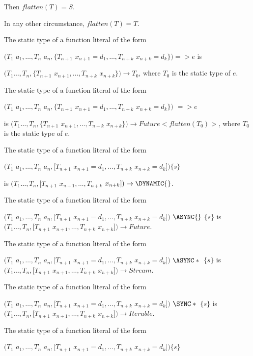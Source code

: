 \documentclass{article}
\begin{document}
Then $flatten(T) = S$.

In any other circumstance, $flatten(T) = T$.

\LMHash{}
The static type of a function literal of the form

$(T_1$ $a_1, \ldots, T_n$ $a_n, \{T_{n+1}$ $x_{n+1} = d_1, \ldots,  T_{n+k}$ $x_{n+k} = d_k\}) => e$
is

$(T_1 \ldots, T_n, \{T_{n+1}$ $x_{n+1}, \ldots, T_{n+k}$ $x_{n+k}\}) \rightarrow T_0$, where $T_0$ is the static type of $e$.

\LMHash{}
The static type of a function literal of the form

$(T_1$ $a_1, \ldots, T_n$ $a_n, \{T_{n+1}$ $x_{n+1} = d_1, \ldots,  T_{n+k}$ $x_{n+k} = d_k\})$ \ASYNC{}  $=> e$

is $(T_1 \ldots, T_n, \{T_{n+1}$ $x_{n+1}, \ldots, T_{n+k}$ $x_{n+k}\}) \rightarrow Future<flatten(T_0)>$, where $T_0$ is the static type of $e$.

\LMHash{}
The static type of a function literal of the form

$(T_1$ $a_1, \ldots, T_n$ $a_n, [T_{n+1}$ $x_{n+1} = d_1, \ldots,  T_{n+k}$ $x_{n+k}= d_k])\{s\}$

is $(T_1 \ldots, T_n, [T_{n+1}$ $x_{n+1}, \ldots, T_{n+k}$ $x_{n+k}]) \rightarrow  \DYNAMIC{}$.

\LMHash{}
The static type of a function literal of the form

$(T_1$ $a_1, \ldots, T_n$ $a_n, [T_{n+1}$ $x_{n+1} = d_1, \ldots,  T_{n+k}$ $x_{n+k}= d_k])$ $ \ASYNC{}$ $\{s\}$
is $(T_1 \ldots, T_n, [T_{n+1}$ $x_{n+1}, \ldots, T_{n+k}$ $x_{n+k}]) \rightarrow Future$.

\LMHash{}
The static type of a function literal of the form

$(T_1$ $a_1, \ldots, T_n$ $a_n, [T_{n+1}$ $x_{n+1} = d_1, \ldots,  T_{n+k}$ $x_{n+k}= d_k])$ $ \ASYNC*{}$ $\{s\}$
is $(T_1 \ldots, T_n, [T_{n+1}$ $x_{n+1}, \ldots, T_{n+k}$ $x_{n+k}]) \rightarrow Stream$.

\LMHash{}
The static type of a function literal of the form

$(T_1$ $a_1, \ldots, T_n$ $a_n, [T_{n+1}$ $x_{n+1} = d_1, \ldots,  T_{n+k}$ $x_{n+k}= d_k])$ $ \SYNC*{}$ $\{s\}$
is $(T_1 \ldots, T_n, [T_{n+1}$ $x_{n+1}, \ldots, T_{n+k}$ $x_{n+k}]) \rightarrow Iterable$.


\LMHash{}
The static type of a function literal of the form

$(T_1$ $a_1, \ldots, T_n$ $a_n, [T_{n+1}$ $x_{n+1} = d_1, \ldots,  T_{n+k}$ $x_{n+k}= d_k])\{s\}$
\end{document}
